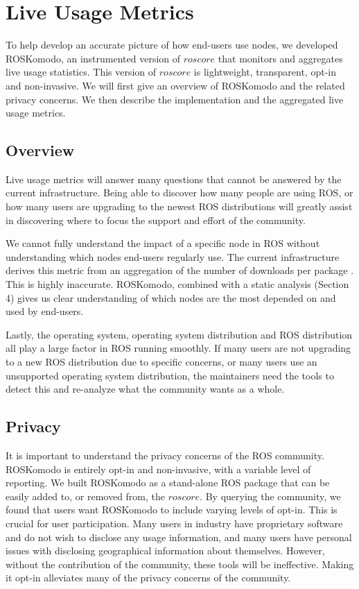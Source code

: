 \documentclass[letterpaper, 10 pt, conference]{ieeeconf}  %
\begin{document}
\section{Live Usage Metrics}

To help develop an accurate picture of how end-users use nodes, we developed ROSKomodo, an instrumented version of $roscore$ that monitors and aggregates live usage statistics. This version of $roscore$ is lightweight, transparent, opt-in and non-invasive. We will first give an overview of ROSKomodo and the related privacy concerns. We then describe the implementation and the aggregated live usage metrics. 

\subsection{Overview}

Live usage metrics will answer many questions that cannot be answered by the current infrastructure. Being able to discover how many people are using ROS, or how many users are upgrading to the newest ROS distributions will greatly assist in discovering where to focus the support and effort of the community.

We cannot fully understand the impact of a specific node in ROS without understanding which nodes end-users regularly use. The current infrastructure derives this metric from an aggregation of the number of downloads per package \cite{ros-metrics}. This is highly inaccurate. ROSKomodo, combined with a static analysis (Section 4) gives us clear understanding of which nodes are the most depended on and used by end-users.

Lastly, the operating system, operating system distribution and ROS distribution all play a large factor in ROS running smoothly. If many users are not upgrading to a new ROS distribution due to specific concerns, or many users use an unsupported operating system distribution, the maintainers need the tools to detect this and re-analyze what the community wants as a whole.

\subsection{Privacy}

It is important to understand the privacy concerns of the ROS community. ROSKomodo is entirely opt-in and non-invasive, with a variable level of reporting. We built ROSKomodo as a stand-alone ROS package that can be easily added to, or removed from, the $roscore$. By querying the community, we found that users want ROSKomodo to include varying levels of opt-in. This is crucial for user participation. Many users in industry have proprietary software and do not wish to disclose any usage information, and many users have personal issues with disclosing geographical information about themselves. However, without the contribution of the community, these tools will be ineffective. Making it opt-in alleviates many of the privacy concerns of the community.
\end{document}
